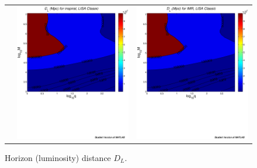 \documentclass{iopart}
\begin{document}
\begin{figure}[htb]
\begin{center}
\begin{tabular}{ccc}
&\includegraphics[scale=0.33,clip=true]{FigEmanuele/InspDLContour.ps}
&\includegraphics[scale=0.33,clip=true]{FigEmanuele/IMRDLContour.ps}\\
\end{tabular}
\caption{\label{fig:DLMiniLISA2} Horizon (luminosity) distance $D_L$.}
\end{center}
\end{figure}
%
\end{document}
